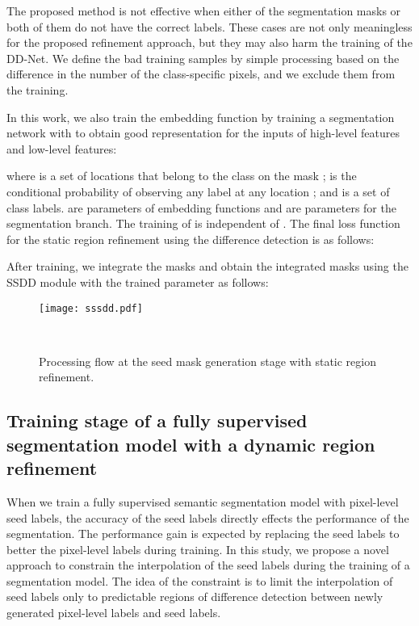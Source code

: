 \documentclass[10pt,twocolumn,letterpaper]{article}
\begin{document}
The proposed method is not effective when either of the segmentation masks or both of them do not have the correct labels.
These cases are not only meaningless for the proposed refinement approach, but they may also harm the training of the DD-Net. 
We define the bad training samples by simple processing based on the difference in the number of the class-specific pixels, and  we exclude them from the training.

In this work, we also train the embedding function by training a segmentation network with  to obtain good representation for the inputs of high-level features and low-level features:


where  is a set of locations that belong to the class  on the mask ;  is the conditional probability of observing any label  at any location ; and  is a set of class labels.
 are parameters of embedding functions and  are parameters for the segmentation branch. 
The training of  is independent of .
The final loss function for the static region refinement using the difference detection is as follows:


After training, we integrate the masks   and obtain the integrated masks  using the SSDD module with the trained parameter  as follows:

\begin{figure}[tb]
\begin{center}
\texttt{[image: sssdd.pdf]}
\caption{Processing flow at the seed mask generation stage with static region refinement.} \label{fig_sssdd}
\vskip -5mm~
\end{center}
\end{figure}

\subsection{Training stage of a fully supervised segmentation model with a dynamic region refinement \label{dynamic}}
When we train a fully supervised semantic segmentation model with pixel-level seed labels,
the accuracy of the seed labels directly effects the performance of the segmentation.
The performance gain is expected by replacing the seed labels to better the pixel-level labels during training.
In this study, we propose a novel approach to constrain the interpolation of the seed labels during the training of a segmentation model.
The idea of the constraint is to limit the interpolation of seed labels only to predictable regions of difference detection between newly generated pixel-level labels and seed labels.
\end{document}
